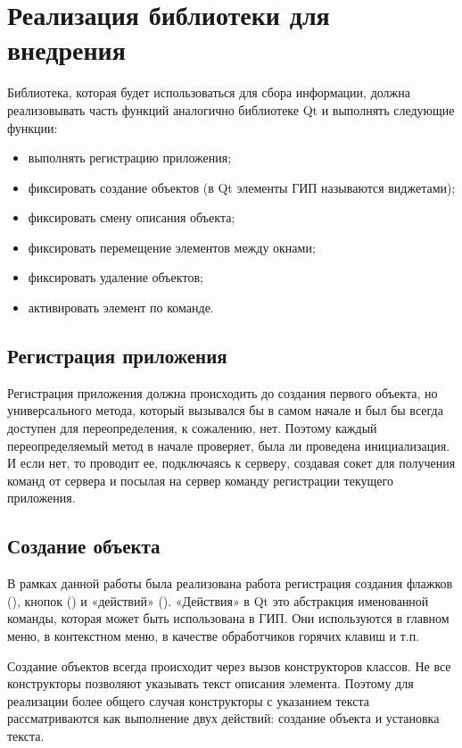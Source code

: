 \section{Реализация библиотеки для внедрения}

Библиотека, которая будет использоваться для сбора информации, должна
реализовывать часть функций аналогично библиотеке Qt и выполнять следующие
функции:

\begin{itemize}
    \item выполнять регистрацию приложения;
    \item фиксировать создание объектов (в Qt элементы ГИП называются
        виджетами);
    \item фиксировать смену описания объекта;
    \item фиксировать перемещение элементов между окнами;
    \item фиксировать удаление объектов;
    \item активировать элемент по команде.
\end{itemize}

\subsection{Регистрация приложения}

Регистрация приложения должна происходить до создания первого объекта, но
универсального метода, который вызывался бы в самом начале и был бы всегда
доступен для переопределения, к сожалению, нет. Поэтому каждый переопределяемый
метод в начале проверяет, была ли проведена инициализация. И если нет, то
проводит ее, подключаясь к серверу, создавая сокет для получения команд от
сервера и посылая на сервер команду регистрации текущего приложения.

\subsection{Создание объекта}

В рамках данной работы была реализована работа регистрация создания флажков
(), кнопок () и «действий» ().
«Действия» в Qt это абстракция именованной команды, которая может быть
использована в ГИП\cite{qaction}. Они используются в главном меню, в контекстном
меню, в качестве обработчиков горячих клавиш и т.п.

Создание объектов всегда происходит через вызов конструкторов классов. Не все
конструкторы позволяют указывать текст описания элемента. Поэтому для реализации
более общего случая конструкторы с указанием текста рассматриваются как
выполнение двух действий: создание объекта и установка текста.

